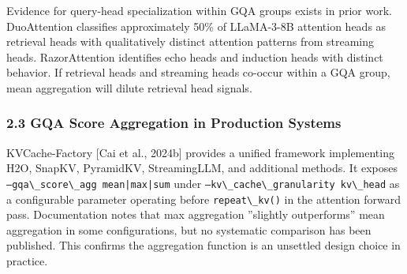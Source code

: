 Evidence for query-head specialization within GQA groups exists in prior work. DuoAttention \citep{Xiao2024} classifies approximately 50\% of LLaMA-3-8B attention heads as retrieval heads with qualitatively distinct attention patterns from streaming heads. RazorAttention \citep{Tang2024RazorAttention} identifies echo heads and induction heads with distinct behavior. If retrieval heads and streaming heads co-occur within a GQA group, mean aggregation will dilute retrieval head signals.

\subsubsection{2.3 GQA Score Aggregation in Production Systems}

KVCache-Factory [Cai et al., 2024b] provides a unified framework implementing H2O, SnapKV, PyramidKV, StreamingLLM, and additional methods. It exposes \texttt{--gqa\textbackslash \_score\textbackslash \_agg mean|max|sum} under \texttt{--kv\textbackslash \_cache\textbackslash \_granularity kv\textbackslash \_head} as a configurable parameter operating before \texttt{repeat\textbackslash \_kv()} in the attention forward pass. Documentation notes that max aggregation ''slightly outperforms'' mean aggregation in some configurations, but no systematic comparison has been published. This confirms the aggregation function is an unsettled design choice in practice.


